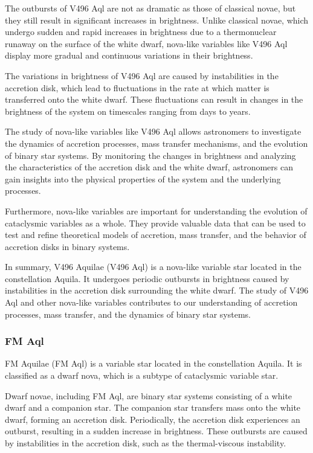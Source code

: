 The outbursts of V496 Aql are not as dramatic as those of classical novae, but they still result in significant increases in brightness. Unlike classical novae, which undergo sudden and rapid increases in brightness due to a thermonuclear runaway on the surface of the white dwarf, nova-like variables like V496 Aql display more gradual and continuous variations in their brightness.

The variations in brightness of V496 Aql are caused by instabilities in the accretion disk, which lead to fluctuations in the rate at which matter is transferred onto the white dwarf. These fluctuations can result in changes in the brightness of the system on timescales ranging from days to years.

The study of nova-like variables like V496 Aql allows astronomers to investigate the dynamics of accretion processes, mass transfer mechanisms, and the evolution of binary star systems. By monitoring the changes in brightness and analyzing the characteristics of the accretion disk and the white dwarf, astronomers can gain insights into the physical properties of the system and the underlying processes.

Furthermore, nova-like variables are important for understanding the evolution of cataclysmic variables as a whole. They provide valuable data that can be used to test and refine theoretical models of accretion, mass transfer, and the behavior of accretion disks in binary systems.

In summary, V496 Aquilae (V496 Aql) is a nova-like variable star located in the constellation Aquila. It undergoes periodic outbursts in brightness caused by instabilities in the accretion disk surrounding the white dwarf. The study of V496 Aql and other nova-like variables contributes to our understanding of accretion processes, mass transfer, and the dynamics of binary star systems.


\subsubsection*{ FM Aql }
FM Aquilae (FM Aql) is a variable star located in the constellation Aquila. It is classified as a dwarf nova, which is a subtype of cataclysmic variable star.

Dwarf novae, including FM Aql, are binary star systems consisting of a white dwarf and a companion star. The companion star transfers mass onto the white dwarf, forming an accretion disk. Periodically, the accretion disk experiences an outburst, resulting in a sudden increase in brightness. These outbursts are caused by instabilities in the accretion disk, such as the thermal-viscous instability.

